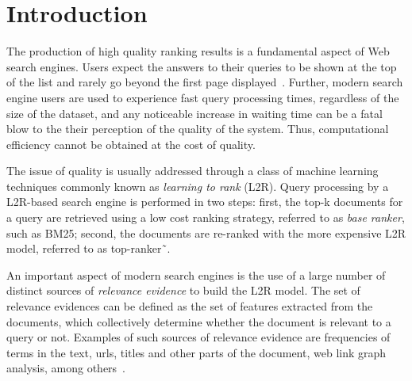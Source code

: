 \documentclass[preprint,review,10pt,3p]{elsarticle}
\begin{document}


\section{Introduction}
\label{intro}

The production of high quality ranking results is a fundamental aspect of Web search engines. Users expect the answers to their queries to be shown at the top of the list and rarely go beyond the first page displayed~\cite{saraiva2001rank}. 
Further, modern search engine users are used to experience fast query processing times, regardless of the size of the dataset, and any noticeable increase in waiting time can be a fatal blow to the their perception of the quality of the system. Thus,
computational efficiency cannot be obtained at the cost of quality. 

The issue of quality is usually addressed through a class of machine learning techniques commonly known as \textit{learning to rank} (L2R). Query processing by a L2R-based search engine is performed in two steps: first, the top-k documents for a query are retrieved using a low cost ranking strategy,  referred to as \emph{base ranker}, such as BM25; second, the documents are re-ranked with the more expensive L2R model, referred to as top-ranker˜\cite{capannini2016quality}.

An important aspect of modern search engines is the use of a large number of distinct sources of \emph{relevance evidence} to build the L2R model. The set of relevance evidences can be defined as the set of features extracted from the documents, which collectively determine whether the document is relevant to a query or not. Examples of such sources of relevance evidence are frequencies of terms in the text, urls, titles and other parts of the document,
web link graph analysis,
among others~\cite{baezaribeiro2011modinforet}. 
\end{document}
